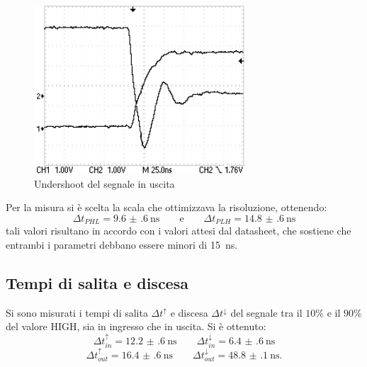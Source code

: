 \documentclass[a4paper,11pt]{article}
\begin{document}
\begin{figure}[H]
	\centering
	\includegraphics[scale=1]{undershoot_lh.png}
	\caption{Undershoot del segnale in uscita}
	\label{f:ripple}
\end{figure}
\noindent Per la misura si è scelta la scala che ottimizzava la risoluzione, ottenendo:
$$\Delta t_{PHL}=\SI{9.6(6)}{\nano \second} \qquad \text{e} \qquad \Delta t_{PLH}=\SI{14.8(6)}{\nano \second}$$
tali valori risultano in accordo con i valori attesi dal datasheet, che sostiene che entrambi i parametri debbano essere minori di \SI{15}{\nano \second}.

\subsection{Tempi di salita e discesa}
Si sono misurati i tempi di salita $\Delta t^{\uparrow}$ e discesa $\Delta t^{\downarrow}$ del segnale tra il $10 \% $ e il $90 \% $ del valore HIGH, sia in ingresso che in uscita. Si è ottenuto:
$$ \Delta t_{in}^{\uparrow}=\SI{12.2(6)}{\nano \second} \qquad \Delta t_{in}^{\downarrow}=\SI{6.4(6)}{\nano \second} $$
$$ \Delta t_{out}^{\uparrow}=\SI{16.4(6)}{\nano \second} \qquad \Delta t_{out}^{\downarrow}=\SI{48.8(1)}{\nano \second}.$$

\newpage
\end{document}
